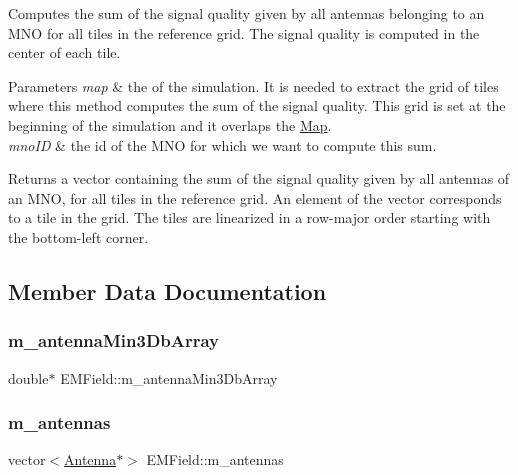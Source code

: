 Computes the sum of the signal quality given by all antennas belonging to an M\+NO for all tiles in the reference grid. The signal quality is computed in the center of each tile. 
\begin{DoxyParams}{Parameters}
{\em map} & the of the simulation. It is needed to extract the grid of tiles where this method computes the sum of the signal quality. This grid is set at the beginning of the simulation and it overlaps the \hyperlink{class_map}{Map}. \\
\hline
{\em mno\+ID} & the id of the M\+NO for which we want to compute this sum. \\
\hline
\end{DoxyParams}
\begin{DoxyReturn}{Returns}
a vector containing the sum of the signal quality given by all antennas of an M\+NO, for all tiles in the reference grid. An element of the vector corresponds to a tile in the grid. The tiles are linearized in a row-\/major order starting with the bottom-\/left corner. 
\end{DoxyReturn}


\subsection{Member Data Documentation}
\mbox{\label{class_e_m_field_a96c4c7bc39c2f8afea0dca3280fe145c}} 
\subsubsection{\texorpdfstring{m\+\_\+antenna\+Min3\+Db\+Array}{m\_antennaMin3DbArray}}
{\footnotesize\ttfamily double$\ast$ E\+M\+Field\+::m\+\_\+antenna\+Min3\+Db\+Array\hspace{0.3cm}{\ttfamily [private]}}

\mbox{\label{class_e_m_field_ab74a3bde70b66fd033bde6c25345a755}} 
\subsubsection{\texorpdfstring{m\+\_\+antennas}{m\_antennas}}
{\footnotesize\ttfamily vector$<$\hyperlink{class_antenna}{Antenna}$\ast$$>$ E\+M\+Field\+::m\+\_\+antennas\hspace{0.3cm}{\ttfamily [private]}}

